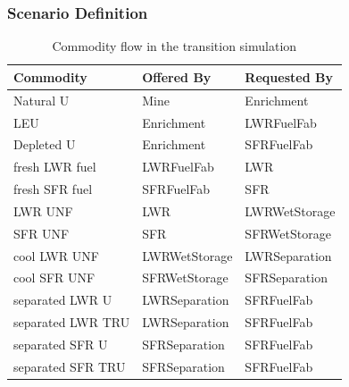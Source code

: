 \begin{frame}[fragile]
  \frametitle{Scenario Definition}
\footnotesize{
\begin{table}[htbp]
\centering
\begin{tabular}{|l|l|l|}
\hline
Commodity  &     Offered By  &    Requested By \\
\hline
Natural  U & Mine & Enrichment \\
LEU & Enrichment & LWRFuelFab \\
Depleted U & Enrichment & SFRFuelFab \\
fresh LWR fuel & LWRFuelFab & LWR \\
fresh SFR fuel & SFRFuelFab & SFR \\
LWR UNF & LWR & LWRWetStorage \\
SFR UNF & SFR & SFRWetStorage \\
cool LWR UNF & LWRWetStorage & LWRSeparation \\
cool SFR UNF & SFRWetStorage & SFRSeparation \\
separated LWR U & LWRSeparation & SFRFuelFab \\
separated LWR TRU & LWRSeparation & SFRFuelFab \\
separated SFR U & SFRSeparation & SFRFuelFab \\
separated SFR TRU & SFRSeparation & SFRFuelFab \\
\hline
\end{tabular}
\caption{Commodity flow in the transition simulation}
\label{tab:commods}
\end{table}
}
\end{frame}

